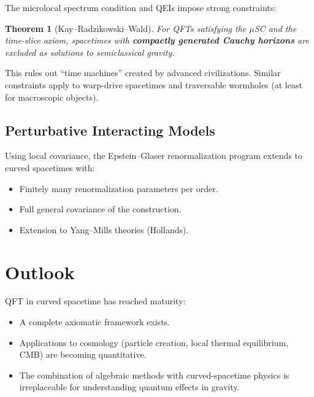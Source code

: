 \documentclass[11pt,a4paper]{article}
\newtheorem{theorem}{Theorem}[section]
\begin{document}
The microlocal spectrum condition and QEIs impose strong constraints:

\begin{theorem}[Kay--Radzikowski--Wald]
For QFTs satisfying the $\mu$SC and the time-slice axiom, spacetimes with
\textbf{compactly generated Cauchy horizons} are excluded as solutions to
semiclassical gravity.
\end{theorem}

This rules out ``time machines'' created by advanced civilizations. Similar
constraints apply to warp-drive spacetimes and traversable wormholes
(at least for macroscopic objects).

\subsection{Perturbative Interacting Models}

Using local covariance, the Epstein--Glaser renormalization program extends
to curved spacetimes with:
\begin{itemize}[nosep]
  \item Finitely many renormalization parameters per order.
  \item Full general covariance of the construction.
  \item Extension to Yang--Mills theories (Hollands).
\end{itemize}

\section{Outlook}

QFT in curved spacetime has reached maturity:
\begin{itemize}[nosep]
  \item A complete axiomatic framework exists.
  \item Applications to cosmology (particle creation, local thermal
        equilibrium, CMB) are becoming quantitative.
  \item The combination of algebraic methods with curved-spacetime physics
        is irreplaceable for understanding quantum effects in gravity.
\end{itemize}
\end{document}
